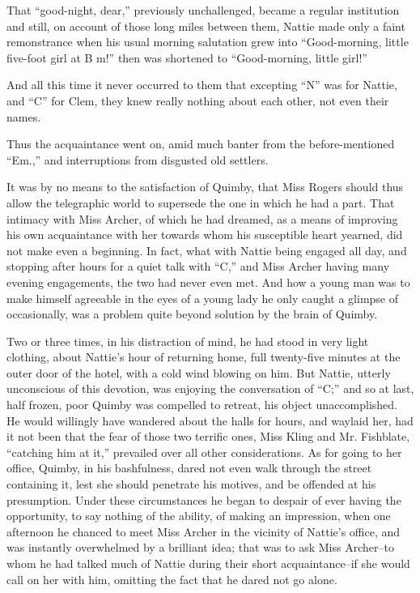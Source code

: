 That ``good-night, dear,'' previously unchallenged, became a regular
institution and still, on account of those long miles between them,
Nattie made only a faint remonstrance when his usual morning salutation
grew into ``Good-morning, little five-foot girl at B m!'' then was
shortened to ``Good-morning, little girl!''

And all this time it never occurred to them that excepting ``N'' was for
Nattie, and ``C'' for Clem, they knew really nothing about each other, not
even their names.

Thus the acquaintance went on, amid much banter from the
before-mentioned ``Em.,'' and interruptions from disgusted old settlers.

It was by no means to the satisfaction of Quimby, that Miss Rogers
should thus allow the telegraphic world to supersede the one in which he
had a part. That intimacy with Miss Archer, of which he had dreamed, as
a means of improving his own acquaintance with her towards whom his
susceptible heart yearned, did not make even a beginning. In fact, what
with Nattie being engaged all day, and stopping after hours for a quiet
talk with ``C,'' and Miss Archer having many evening engagements, the two
had never even met. And how a young man was to make himself agreeable in
the eyes of a young lady he only caught a glimpse of occasionally, was a
problem quite beyond solution by the brain of Quimby.

Two or three times, in his distraction of mind, he had stood in very
light clothing, about Nattie's hour of returning home, full twenty-five
minutes at the outer door of the hotel, with a cold wind blowing on him.
But Nattie, utterly unconscious of this devotion, was enjoying the
conversation of ``C;'' and so at last, half frozen, poor Quimby was
compelled to retreat, his object unaccomplished. He would willingly have
wandered about the halls for hours, and waylaid her, had it not been
that the fear of those two terrific ones, Miss Kling and Mr. Fishblate,
``catching him at it,'' prevailed over all other considerations. As for
going to her office, Quimby, in his bashfulness, dared not even walk
through the street containing it, lest she should penetrate his motives,
and be offended at his presumption. Under these circumstances he began
to despair of ever having the opportunity, to say nothing of the
ability, of making an impression, when one afternoon he chanced to meet
Miss Archer in the vicinity of Nattie's office, and was instantly
overwhelmed by a brilliant idea; that was to ask Miss Archer--to whom he
had talked much of Nattie during their short acquaintance--if she would
call on her with him, omitting the fact that he dared not go alone.

